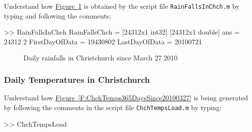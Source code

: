 

\begin{labwork}\label{LW:ChchDailyRainfallSince}
Understand how \hyperref[F:ChchDailyRainfallSince]{Figure~\ref*{F:ChchDailyRainfallSince}} is obtained by the script file {\tt RainFallsInChch.m} by typing and following the comments:

\begin{VrbM}
>> RainFallsInChch
RainFallsChch =     [24312x1 int32]    [24312x1 double]
ans =       24312           2
FirstDayOfData =    19430802
LastDayOfData =    20100721
\end{VrbM}

\end{labwork}

\begin{figure}[htpb]
\caption{Daily rainfalls in Christchurch since March 27 2010 \label{F:ChchDailyRainfallSince}}
\centering   {}
\end{figure}

\subsubsection{Daily Temperatures in Christchurch}


\begin{labwork}\label{LW:ChchTempsLoad}
Understand how \hyperref[F:ChchTemps365DaysSince20100327]{Figure~\ref*{F:ChchTemps365DaysSince20100327}} is being generated by following the comments in the script file {\tt ChchTempsLoad.m} by typing:
\begin{VrbM}
>> ChchTempsLoad
\end{VrbM}
\end{labwork}

